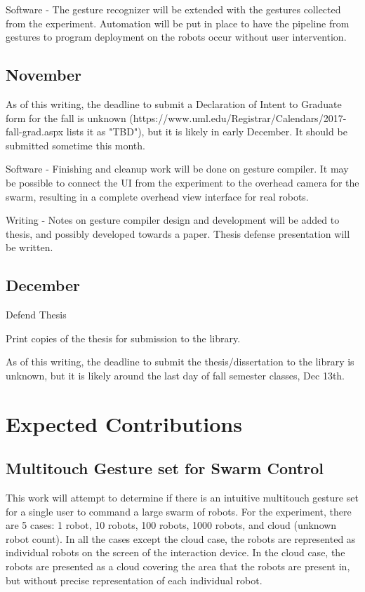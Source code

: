 \documentclass[]{article}
\begin{document}
Software - The gesture recognizer will be extended with the gestures collected from the experiment.
Automation will be put in place to have the pipeline from gestures to program deployment on the robots occur without user intervention. 

\subsection{November}

As of this writing, the deadline to submit a Declaration of Intent to Graduate form for the fall is unknown (https://www.uml.edu/Registrar/Calendars/2017-fall-grad.aspx lists it as "TBD"), but it is likely in early December. It should be submitted sometime this month. 

Software - Finishing and cleanup work will be done on gesture compiler. It may be possible to connect the UI from the experiment to the overhead camera for the swarm, resulting in a complete overhead view interface for real robots. 

Writing - Notes on gesture compiler design and development will be added to thesis, and possibly developed towards a paper. Thesis defense presentation will be written.

\subsection{December}

Defend Thesis

Print copies of the thesis for submission to the library. 

As of this writing, the deadline to submit the thesis/dissertation to the library is unknown, but it is likely around the last day of fall semester classes, Dec 13th. 

\section{Expected Contributions}

\subsection{Multitouch Gesture set for Swarm Control}
This work will attempt to determine if there is an intuitive multitouch gesture set for a single user to command a large swarm of robots.
For the experiment, there are 5 cases: 1 robot, 10 robots, 100 robots, 1000 robots, and cloud (unknown robot count). 
In all the cases except the cloud case, the robots are represented as individual robots on the screen of the interaction device. 
In the cloud case, the robots are presented as a cloud covering the area that the robots are present in, but without precise representation of each individual robot. 
\end{document}
